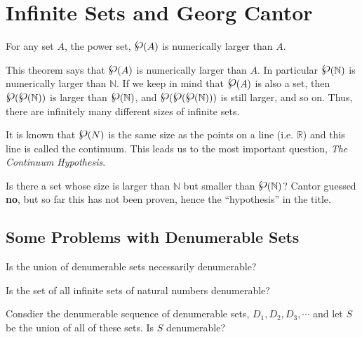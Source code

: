 \section{Infinite Sets and Georg Cantor}
\begin{theorem}
For any set $A$, the power set, $\powerset(A)$ is numerically larger than $A$.
\end{theorem}

This theorem says that  $\powerset(A)$ is numerically larger than $A$.  In particular  $\powerset(\mathbb{N})$ is numerically larger than $\mathbb{N}$.  If we keep in mind that $\powerset(A)$ is also a set, then $\powerset(\powerset(\mathbb{N}))$ is larger than $\powerset(\mathbb{N})$, and $\powerset(\powerset(\powerset(\mathbb{N})))$ is still larger, and so on.  Thus, there are infinitely many different sizes of infinite sets.

It is known that $\powerset(N)$ is the same size as the points on a line (i.e. $\mathbb{R}$) and this line is called the continuum.  This leads us to the most important question, \emph{The Continuum Hypothesis}.

\begin{idea}
Is there a set whose size is larger than $\mathbb{N}$ but smaller than $\powerset(\mathbb{N})$? Cantor guessed {\bf no}, but so far this has not been proven, hence the ``hypothesis'' in the title.
\end{idea}

\subsection*{Some Problems with Denumerable Sets}

\begin{problem} 
Is the union of denumerable sets necessarily denumerable?
\end{problem}

\begin{problem}
Is the set of all infinite sets of natural numbers denumerable?
\end{problem}

\newpage
\begin{problem}
Consdier the denumerable sequence of denumerable sets, $D_1, D_2, D_3, \cdots$ and let $S$ be the union of all of these sets.  Is $S$ denumerable?
\end{problem}

